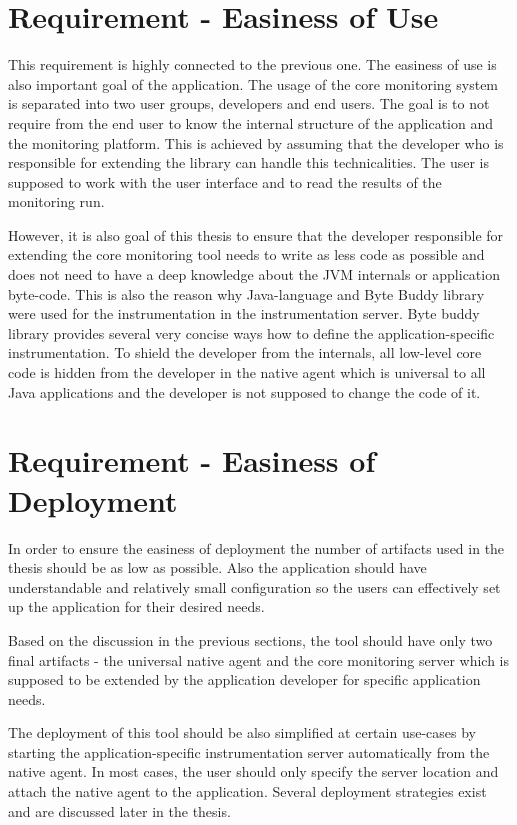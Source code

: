 \section{Requirement - Easiness of Use}
This requirement is highly connected to the previous one. The easiness of use is also important goal of the application. The usage of the core monitoring system is separated into two user groups, developers and end users. The goal is to not require from the end user to know the internal structure of the application and the monitoring platform. This is achieved by assuming that the developer who is responsible for extending the library can handle this technicalities. The user is supposed to work with the user interface and to read the results of the monitoring run. 

However, it is also goal of this thesis to ensure that the developer responsible for extending the core monitoring tool needs to write as less code as possible and does not need to have a deep knowledge about the JVM internals or application byte-code. This is also the reason why Java-language and Byte Buddy library were used for the instrumentation in the instrumentation server. Byte buddy library provides several very concise ways how to define the application-specific instrumentation. To shield the developer from the internals, all low-level core code is hidden from the developer in the native agent which is universal to all Java applications and the developer is not supposed to change the code of it.

\section{Requirement - Easiness of Deployment}
In order to ensure the easiness of deployment the number of artifacts used in the thesis should be as low as possible. Also the application should have understandable and relatively small configuration so the users can effectively set up the application for their desired needs. 

Based on the discussion in the previous sections, the tool should have only two final artifacts - the universal native agent and the core monitoring server which is supposed to be extended by the application developer for specific application needs.

The deployment of this tool should be also simplified at certain use-cases by starting the application-specific instrumentation server automatically from the native agent. In most cases, the user should only specify the server location and attach the native agent to the application. Several deployment strategies exist and are discussed later in the thesis.

